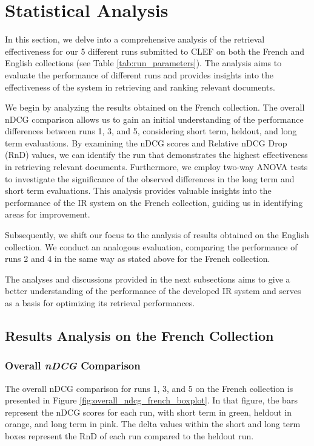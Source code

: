 \section{Statistical Analysis}
\label{sec:analysis}

In this section, we delve into a comprehensive analysis of the retrieval effectiveness for our 5 different runs submitted to \ac{CLEF} on both the French and English collections (see Table \ref{tab:run_parameters}). 
The analysis aims to evaluate the performance of different runs and provides insights into the effectiveness of the system in retrieving and ranking relevant documents.

We begin by analyzing the results obtained on the French collection. 
The overall nDCG comparison allows us to gain an initial understanding of the performance differences between runs 1, 3, and 5, considering short term, heldout, and long term evaluations. 
By examining the nDCG scores and Relative nDCG Drop (RnD) values, we can identify the run that demonstrates the highest effectiveness in retrieving relevant documents. 
Furthermore, we employ two-way ANOVA tests to investigate the significance of the observed differences in the long term and short term evaluations. 
This analysis provides valuable insights into the performance of the \ac{IR} system on the French collection, guiding us in identifying areas for improvement.

Subsequently, we shift our focus to the analysis of results obtained on the English collection. 
We conduct an analogous evaluation, comparing the performance of runs 2 and 4 in the same way as stated above for the French collection. 

The analyses and discussions provided in the next subsections aims to give a better understanding of the performance of the developed \ac{IR} system and serves as a basis for optimizing its retrieval performances.

\newpage
\subsection{Results Analysis on the French Collection}

\subsubsection{Overall \textit{nDCG} Comparison} \label{sec:ndcg_comparison_french}

The overall \ac{nDCG} comparison for runs 1, 3, and 5 on the French collection is presented in Figure \ref{fig:overall_ndcg_french_boxplot}. 
In that figure, the bars represent the \ac{nDCG} scores for each run, with short term in green, heldout in orange, and long term in pink. 
The delta values within the short and long term boxes represent the \ac{RnD} of each run compared to the heldout run. 

